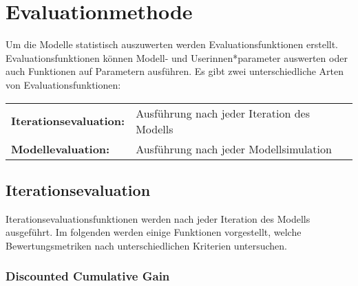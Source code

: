 \chapter{Evaluationmethode}

Um die Modelle statistisch auszuwerten werden Evaluationsfunktionen erstellt. Evaluationsfunktionen können Modell-  und Userinnen*parameter auswerten oder auch Funktionen auf Parametern ausführen.
Es gibt zwei unterschiedliche Arten von Evaluationsfunktionen: %

\begin{table}[!htbp]
	\begin{tabularx}{\textwidth}{lX}
		\textbf{Iterationsevaluation:} &  Ausführung nach jeder Iteration des Modells\\
		\textbf{Modellevaluation:} & Ausführung nach jeder Modellsimulation  \\
	\end{tabularx}
\end{table}

\section{Iterationsevaluation}
\label{sec:evaluationsfunktionen}


Iterationsevaluationsfunktionen werden nach jeder Iteration des Modells ausgeführt. Im folgenden werden einige Funktionen vorgestellt, welche Bewertungsmetriken nach unterschiedlichen Kriterien untersuchen.


\subsection{Discounted Cumulative Gain}

